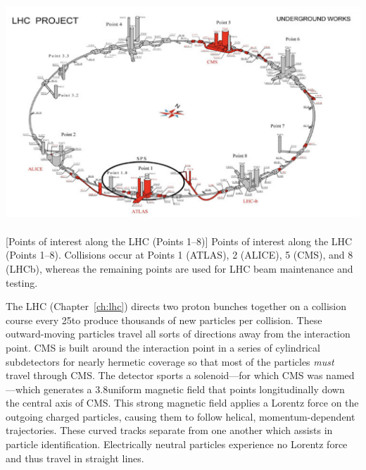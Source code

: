 \begin{multiFigure}
    \centering
    \includegraphics[height=9cm,keepaspectratio]{figures/cms/lhc_points_with_buildings.png}
        [Points of interest along the LHC (Points 1--8)]
        {Points of interest along the LHC (Points 1--8).
        Collisions occur at Points 1 (ATLAS), 2 (ALICE), 5 (CMS), and 8 (LHCb), whereas the remaining points are used for LHC beam maintenance and testing.} 
    \label{fig:lhc_points}
\end{multiFigure}

The LHC (Chapter~\ref{ch:lhc}) directs two proton bunches together on a collision course every 25\ns to produce thousands of new particles per \pp collision.
These outward-moving particles travel all sorts of directions away from the interaction point.
CMS is built around the interaction point in a series of cylindrical subdetectors for nearly hermetic coverage so that most of the particles \emph{must} travel through CMS.
The detector sports a solenoid---for which CMS was named---which generates a 3.8\tesla uniform magnetic field that points longitudinally down the central axis of CMS.
This strong magnetic field applies a Lorentz force on the outgoing charged particles, causing them to follow helical, momentum-dependent trajectories.
These curved tracks separate from one another which assists in particle identification.
Electrically neutral particles experience no Lorentz force and thus travel in straight lines.

